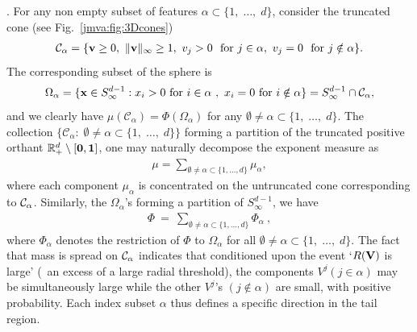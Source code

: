 . For any non empty subset of features $\alpha\subset\{1,\; \ldots,\; d \}$, consider the truncated cone (see Fig.~\ref{jmva:fig:3Dcones})
 \begin{align}
 \label{jmva:cone}
 \mathcal{C}_\alpha = \{\mathbf v \ge 0,~\|\mathbf v\|_\infty \ge 1,~ v_j > 0 ~\text{ for } j \in \alpha,~ v_j = 0 ~\text{ for } j \notin \alpha \}.
 \end{align}
The corresponding subset of the sphere is 
\begin{align}
\Omega_{\alpha}  = \{\mathbf x \in S_{\infty}^{d-1} :  x_i > 0 \text{ for } i\in\alpha~,~  x_i = 0 \text{ for } i\notin \alpha   \} 
 = S_{\infty}^{d-1}\cap {\mathcal{C}}_\alpha, \nonumber
\end{align}
and we clearly have $\mu(\mathcal{C}_\alpha) =  \Phi(\Omega_\alpha)$ for any $\emptyset\neq \alpha \subset\{1,\; \ldots,\; d \}$.
The collection $\{\mathcal{C}_\alpha:\; \emptyset \neq
\alpha\subset \{1,\; \ldots,\; d \}\}$ forming a partition of the
truncated positive orthant $\mathbb{R}_+^{d}\setminus[\mathbf 0,\mathbf 1]$, one may naturally decompose the exponent measure as 
\begin{align}\label{jmva:eq:decomp1}
 \mu = \sum_{\emptyset \neq \alpha\subset\{1,\ldots ,d\}}
\mu_\alpha,
\end{align} 
where each component $\mu_\alpha$ is concentrated on the
untruncated cone corresponding to ${\cal C_\alpha}$.
Similarly, 
 the $\Omega_\alpha $'s forming  a partition of
$S_\infty^{d-1}$, we have 
\begin{align}
 \Phi ~=~ \sum_{\emptyset \neq \alpha\subset\{1,\ldots ,d\}} \Phi_\alpha ~, \nonumber
\end{align}  
where $\Phi_\alpha$ denotes the restriction of $\Phi$ to %
${\Omega}_\alpha$ for all $\emptyset\neq \alpha \subset\{1,\; \ldots,\; d \}$.
The fact that mass is spread on   $\mathcal{C}_\alpha$ indicates that conditioned upon
the event `$R(\mathbf V)$ is large' (\ie~an excess of a large radial threshold),
the components $V^j (j\in\alpha)$ may be simultaneously large while
the other  $V^j$'s  $(j\notin\alpha)$ are small, with positive
probability.
Each index subset $\alpha$ thus defines a specific direction in the tail region. 

